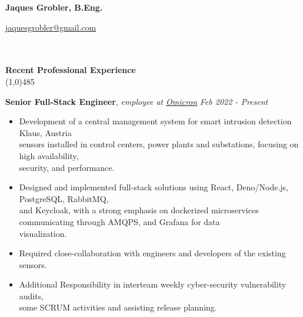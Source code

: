 \documentclass[9pt]{extarticle}
\newcommand\negativespace[1][-0.12cm]{\hspace*{#1}}
\begin{document}
\centerline{{\LARGE \bf Jaques Grobler, B.Eng.}}
\centerline{\href{mailto:jaquesgrobler@gmail.com}{jaquesgrobler@gmail.com}}


\noindent %
\\\\
\vspace*{-6pt}
{\negativespace \Large \bf Recent Professional Experience}\\
\line(1,0){485}
\\
\noindent

\noindent
{\bf Senior Full-Stack Engineer}, \textit{employee at \href{https://www.omicronenergy.com/de/}{Omicron}}  \hfill \textit{Feb 2022 - Present}
\begin{itemize}
\setlength\itemsep{0.05em}
\item Development of a central management system for smart intrusion detection \hfill Klaus, Austria \\
sensors installed in control centers, power plants and substations, focusing on high availability, \\
security, and performance.
\item Designed and implemented full-stack solutions using React, Deno/Node.js, PostgreSQL, RabbitMQ, \\
and Keycloak, with a strong emphasis on dockerized microservices communicating through AMQPS, and Grafana for data \\
visualization.
\item Required close-collaboration with engineers and developers of the existing sensors.
\item Additional Responsibility in interteam weekly cyber-security vulnerability audits,\\
some SCRUM activities and assisting release planning.
\end{itemize}
\end{document}
